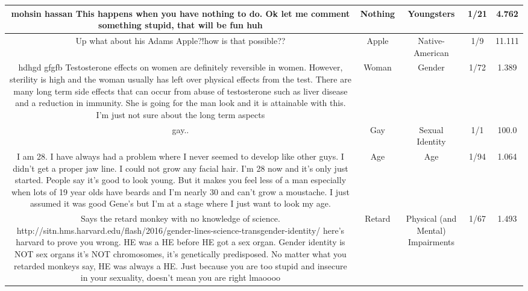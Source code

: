 \documentclass[11pt]{article}
\newlength\mylength
\begin{document}
\begin{center}
\begin{longtable}{|C{.40\mylength}|C{.30\mylength}|C{.15\mylength}|C{.15\mylength}|C{.15\mylength}|}
  mohsin hassan This happens when you have nothing to do.  Ok let me comment something stupid, that will be fun  huh  & Nothing & Youngsters & 1/21 & 4.762 \\  \hline
  Up what about his Adams Apple?!how is that possible??  & Apple & Native-American & 1/9 & 11.111 \\  \hline
  hdhgd gfgfb Testosterone effects on women are definitely reversible in women. However, sterility is high and the woman usually has left over physical effects from the test. There are many long term side effects that can occur from abuse of testosterone such as liver disease and a reduction in immunity. She is going for the man look and it is attainable with this. I'm just not sure about the long term aspects  & Woman & Gender & 1/72 & 1.389 \\  \hline
  gay..  & Gay & Sexual Identity & 1/1 & 100.0 \\  \hline
  I am 28. I have always had a problem where I never seemed to develop like other guys. I didn't get a proper jaw line. I could not grow any facial hair. I'm 28 now and it's only just started.  People say it's good to look young. But it makes you feel less of a man especially when lots of 19 year olds have beards and I'm nearly 30 and can't grow a moustache. I just assumed it was good Gene's but I'm at a stage where I just want to look my age.  & Age & Age & 1/94 & 1.064 \\  \hline
  Says the retard monkey with no knowledge of science. http://sitn.hms.harvard.edu/flash/2016/gender-lines-science-transgender-identity/ here's harvard to prove you wrong. HE was a HE before HE got a sex organ. Gender identity is NOT sex organs it's NOT chromosomes, it's genetically predisposed. No matter what you retarded monkeys say, HE was always a HE. Just because you are too stupid and insecure in your sexuality, doesn't mean you are right lmaoooo  & Retard & Physical (and Mental) Impairments & 1/67 & 1.493 \\  \hline

\end{longtable}
\end{center}
\end{document}
